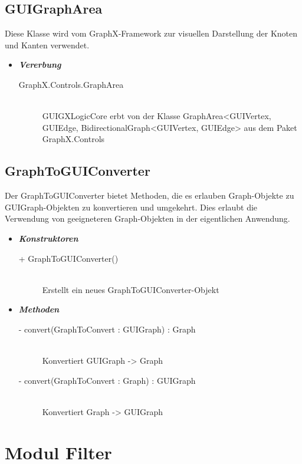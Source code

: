 \documentclass[13pt]{scrreprt}
\begin{document}
	\subsection{GUIGraphArea}
	Diese Klasse wird vom GraphX-Framework zur visuellen Darstellung der Knoten und Kanten verwendet.
	\begin{itemize}[label = {$\circ$}]
		\item {\large \textbf{\textit{Vererbung}}\par}
		\begin{description}
			\item [GraphX.Controls.GraphArea] \hfill \\ GUIGXLogicCore erbt von der Klasse GraphArea<GUIVertex, GUIEdge, BidirectionalGraph<GUIVertex, GUIEdge> aus dem Paket GraphX.Controls
		\end{description}
	\end{itemize}
	
	\subsection{GraphToGUIConverter}
	Der GraphToGUIConverter bietet Methoden, die es erlauben Graph-Objekte zu GUIGraph-Objekten zu konvertieren und umgekehrt. Dies erlaubt die Verwendung von geeigneteren Graph-Objekten in der eigentlichen Anwendung.
	\begin{itemize}[label = {$\circ$}]
		\item {\large \textbf{\textit{Konstruktoren}}\par}
		\begin{description}
			\item [+ GraphToGUIConverter()] \hfill \\ Erstellt ein neues GraphToGUIConverter-Objekt
		\end{description}
		\item {\large \textbf{\textit{Methoden}}\par}
		\begin{description}
			\item [- convert(GraphToConvert : GUIGraph) : Graph] \hfill \\ Konvertiert GUIGraph -> Graph
			\item [- convert(GraphToConvert : Graph) : GUIGraph] \hfill \\ Konvertiert Graph -> GUIGraph
		\end{description}
	\end{itemize}
	
	
	\section{Modul Filter}
	
\end{document}
